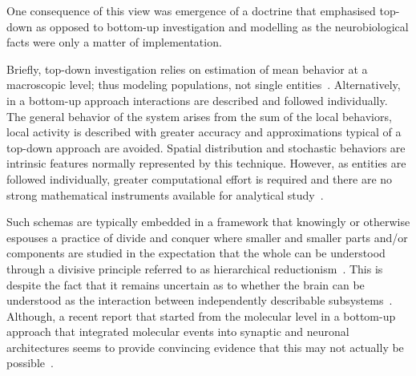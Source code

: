 \documentclass[10pt,letterpaper]{article}
\begin{document}
One consequence of this view was emergence of a doctrine that emphasised top-down as opposed to bottom-up investigation and modelling as the neurobiological facts were only a matter of implementation.

Briefly, top-down investigation relies on estimation of mean behavior at a macroscopic level; thus modeling populations, not single entities~\cite{chiacchio14}.  Alternatively, in a bottom-up approach interactions are described and followed individually. The general behavior of the system arises from the sum of the local behaviors, local activity is described with greater accuracy and approximations typical of a top-down approach are avoided.  Spatial distribution and stochastic behaviors are intrinsic features normally represented by this technique. However, as entities are followed individually, greater computational effort is required and there are no strong mathematical instruments available for analytical study~\cite{chiacchio14}.

Such schemas are typically embedded in a framework that knowingly or otherwise espouses a practice of divide and conquer where smaller and smaller parts and/or components are studied in the expectation that the whole can be understood through a divisive principle referred to as hierarchical reductionism~\cite{dawkins06}. This is despite the fact that it remains uncertain as to whether the brain can be understood as the interaction between independently describable subsystems~\cite{djurfeldt08}. Although, a recent report that started from the molecular level in a bottom-up approach that integrated molecular events into synaptic and neuronal architectures seems to provide convincing evidence that this may not actually be possible~\cite{bouteiller11}.

\end{document}
